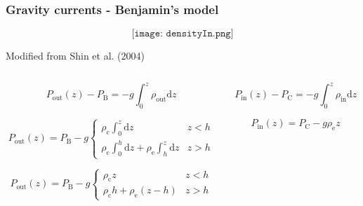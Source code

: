 \documentclass{beamer}
\begin{document}
\begin{frame}
  \frametitle{Gravity currents - Benjamin's model}

  $$\texttt{[image: densityIn.png]}$$

  \vspace{-0.75cm}

  \begin{center}
  \tiny Modified from Shin et al. (2004)
  \end{center}

  \vspace{-0.75cm}
  
  \begin{columns}[t]

    \begin{column}{0.5\paperwidth}

      $$ P_{\text{out}}(z) - P_{\text{B}} = - g \int_{0}^{z} \rho_{\text{out}} \mathrm{d} z $$

      \vspace{-0.75cm}
  
      $$ P_{\text{out}}(z) = P_{\text{B}} - g \begin{cases}
        \rho_{\text{c}} \int_{0}^{z} \mathrm{d} z & z < h \\
        \rho_{\text{c}} \int_{0}^{h} \mathrm{d} z + \rho_{\text{e}} \int_{h}^{z} \mathrm{d} z & z > h
        \end{cases} $$

      \vspace{-0.75cm}
  
      $$ P_{\text{out}}(z) = P_{\text{B}} - g \begin{cases}
        \rho_{\text{c}} z & z < h \\
        \rho_{\text{c}} h + \rho_{\text{e}} (z - h) & z > h
        \end{cases} $$
    \end{column}

    \begin{column}{0.5\paperwidth}

      $$ P_{\text{in}}(z) - P_{\text{C}} = - g \int_{0}^{z} \rho_{\text{in}} \mathrm{d} z $$

      $$ P_{\text{in}}(z) = P_{\text{C}} - g \rho_{\text{e}} z$$
    \end{column}

  \end{columns}
\end{frame}
\end{document}
